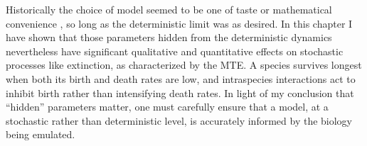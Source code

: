 Historically the choice of model seemed to be one of taste or mathematical convenience \cite{Greenhalgh1990,Ovaskainen2010,Assaf2010,Allen2003,Norden1982,Newman2004,Allen2005,Fujita1953,Nasell2001}, so long as the deterministic limit was as desired. 
In this chapter I have shown that those parameters hidden from the deterministic dynamics nevertheless have significant qualitative and quantitative effects on stochastic processes like extinction, as characterized by the MTE. 
A species survives longest when both its birth and death rates are low, and intraspecies interactions act to inhibit birth rather than intensifying death rates. 
In light of my conclusion that ``hidden'' parameters matter, one must carefully ensure that a model, at a stochastic rather than deterministic level, is accurately informed by the biology being emulated. 






